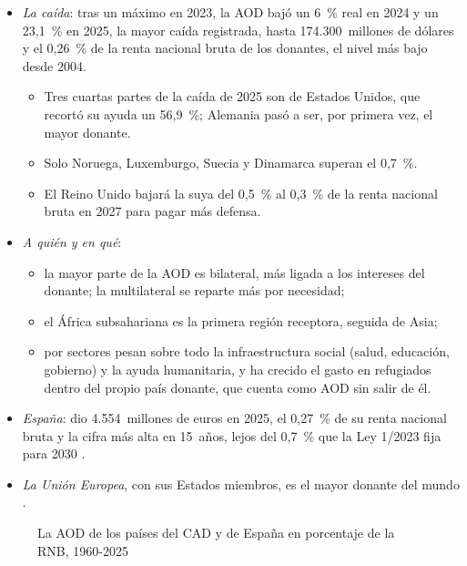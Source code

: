 \documentclass[11pt]{article}
\begin{document}
\begin{itemize}
\item \emph{La caída}: tras un máximo en 2023, la AOD bajó un 6~\% real en 2024\nocite{OCDE2025AODFinal2024} y un 23,1~\% en 2025, la mayor caída registrada, hasta 174.300~millones de dólares y el 0,26~\% de la renta nacional bruta de los donantes, el nivel más bajo desde 2004\nocite{OCDE2026AODPreliminar,OCDE2026DAC1}.
  \begin{itemize}
  \item Tres cuartas partes de la caída de 2025 son de Estados Unidos, que recortó su ayuda un 56,9~\%; Alemania pasó a ser, por primera vez, el mayor donante\nocite{OCDE2026AODPreliminar,OCDE2026DAC1}.
  \item Solo Noruega, Luxemburgo, Suecia y Dinamarca superan el 0,7~\%\nocite{OCDE2026AODPreliminar}.
  \item El Reino Unido bajará la suya del 0,5~\% al 0,3~\% de la renta nacional bruta en 2027 para pagar más defensa\nocite{ReinoUnido2025AOD}.
  \end{itemize}
\item \emph{A quién y en qué}:
  \begin{itemize}
  \item la mayor parte de la AOD es bilateral, más ligada a los intereses del donante; la multilateral se reparte más por necesidad;
  \item el África subsahariana es la primera región receptora, seguida de Asia;
  \item por sectores pesan sobre todo la infraestructura social (salud, educación, gobierno) y la ayuda humanitaria, y ha crecido el gasto en refugiados dentro del propio país donante, que cuenta como AOD sin salir de él\nocite{OCDE2026DAC1}.
  \end{itemize}
\item \emph{España}: dio 4.554~millones de euros en 2025, el 0,27~\% de su renta nacional bruta y la cifra más alta en 15~años\nocite{OCDE2026DAC1,Exteriores2026AOD}, lejos del 0,7~\% que la Ley 1/2023 fija para 2030\nocite{BOE2023LeyCooperacion} .
\item \emph{La Unión Europea}, con sus Estados miembros, es el mayor donante del mundo .
\end{itemize}

\begin{figure}[H]
\centering
\caption{La AOD de los países del CAD y de España en porcentaje de la RNB, 1960-2025}\label{fig:aod-rnb}
\end{figure}
\end{document}

